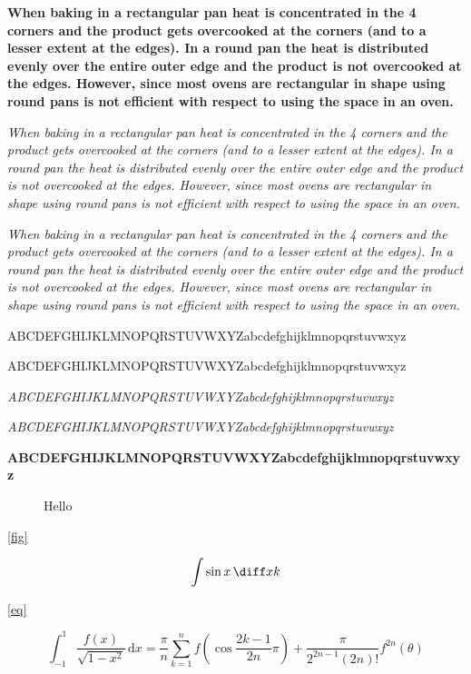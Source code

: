 \bf
When baking in a rectangular pan heat is concentrated in the 4 corners and the product gets overcooked at the corners (and to a lesser extent at the edges). In a round pan the heat is distributed evenly over the entire outer edge and the product is not overcooked at the edges. However, since most ovens are rectangular in shape using round pans is not efficient with respect to using the space in an oven.

\it
When baking in a rectangular pan heat is concentrated in the 4 corners and the product gets overcooked at the corners (and to a lesser extent at the edges). In a round pan the heat is distributed evenly over the entire outer edge and the product is not overcooked at the edges. However, since most ovens are rectangular in shape using round pans is not efficient with respect to using the space in an oven.

\sl
When baking in a rectangular pan heat is concentrated in the 4 corners and the product gets overcooked at the corners (and to a lesser extent at the edges). In a round pan the heat is distributed evenly over the entire outer edge and the product is not overcooked at the edges. However, since most ovens are rectangular in shape using round pans is not efficient with respect to using the space in an oven.

\rm
ABCDEFGHIJKLMNOPQRSTUVWXYZabcdefghijklmnopqrstuvwxyz

\sf
ABCDEFGHIJKLMNOPQRSTUVWXYZabcdefghijklmnopqrstuvwxyz

\it
ABCDEFGHIJKLMNOPQRSTUVWXYZabcdefghijklmnopqrstuvwxyz

\sl
ABCDEFGHIJKLMNOPQRSTUVWXYZabcdefghijklmnopqrstuvwxyz

\bf
ABCDEFGHIJKLMNOPQRSTUVWXYZabcdefghijklmnopqrstuvwxyz

\rm

\begin{figure}[htb]
\caption{Hello}
\label{fig}
\end{figure}

\autoref{fig}

\begin{equation}
\int\sin x \,\diff xk \label{eq}
\end{equation}

\autoref{eq}

$$  \int_{-1}^{1} \frac{f(x)}{\sqrt{1-x^2}}\,\mathrm{d}x
   =\frac{\pi}{n}\sum_{k=1}^{n}f\left(\cos\frac{2k-1}{2n}\pi\right)
   +\frac{\pi}{2^{2n-1}(2n)!}f^{2n}(\theta) $$
